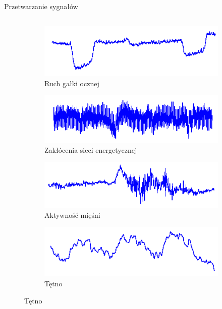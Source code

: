 \documentclass[10pt,aspectratio=169]{beamer}
\begin{document}
\begin{frame}{Przetwarzanie sygnałów}
\begin{columns}
\begin{column}{0.6\textwidth}
{\begin{figure}[htb]
          \medskip
          \begin{subfigure}{0.48\linewidth}
          \includegraphics[width=\linewidth,keepaspectratio]{obrazy/eeg_noise_eye}
          \caption{Ruch gałki ocznej}
          \end{subfigure}\hspace*{\fill}
          \begin{subfigure}{0.48\linewidth}
          \includegraphics[width=\linewidth,keepaspectratio]{obrazy/eeg_noise_line}
          \caption{Zakłócenia sieci energetycznej}
          \end{subfigure}
          
          \medskip
          \begin{subfigure}{0.48\linewidth}
          \includegraphics[width=\linewidth,keepaspectratio]{obrazy/eeg_noise_muscle}
          \caption{Aktywność mięśni}
          \end{subfigure}\hspace*{\fill}
          \begin{subfigure}{0.48\linewidth}
          \includegraphics[width=\linewidth,keepaspectratio]{obrazy/eeg_noise_pulse}
          \caption{Tętno}
          \end{subfigure}
        \end{figure}
      }
    \end{column}
  \end{columns}
\end{frame}
\end{document}
